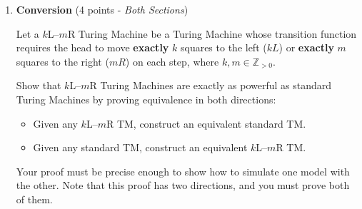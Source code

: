\documentclass[11pt]{article}
\begin{document}
\begin{enumerate}
\begin{itemize}
    \begin{answer}
     \end{answer}

     

 \end{itemize}
 
 \item \textbf{Conversion} (4 points - \textit{Both Sections})

Let a $k$L--$m$R Turing Machine be a Turing Machine whose transition function requires the head to move \textbf{exactly} $k$ squares to the left ($kL$) or \textbf{exactly} $m$ squares to the right ($mR$) on each step, where $k,m\in\mathbb{Z}_{>0}$.

Show that $k$L--$m$R Turing Machines are exactly as powerful as standard Turing Machines by proving equivalence in both directions:
\begin{itemize}
  \item Given any $k$L--$m$R TM, construct an equivalent standard TM.
  \item Given any standard TM, construct an equivalent $k$L--$m$R TM.
\end{itemize}

Your proof must be precise enough to show how to simulate one model with the other. Note that this proof has two directions, and you must prove both of them. \\


\end{enumerate}
\end{document}
